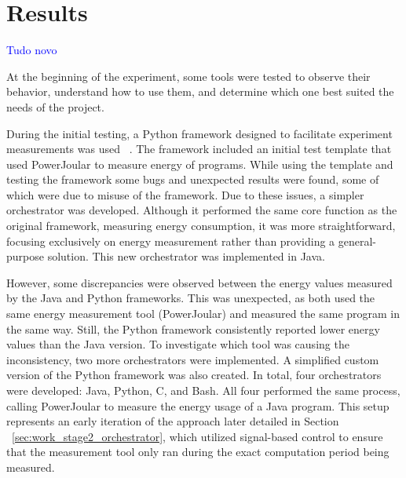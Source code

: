 \chapter{Results}\label{chapter:results}\textcolor{blue}{Tudo novo}


At the beginning of the experiment, some tools were tested to observe their behavior, understand how to use them, and determine which one best suited the needs of the project.

During the initial testing, a Python framework designed to facilitate experiment measurements was used ~\cite{S2_Group_Experiment_Runner}. The framework included an initial test template that used PowerJoular to measure energy of programs. While using the template and testing the framework some bugs and unexpected results were found, some of which were due to misuse of the framework.
Due to these issues, a simpler orchestrator was developed. Although it performed the same core function as the original framework, measuring energy consumption, it was more straightforward, focusing exclusively on energy measurement rather than providing a general-purpose solution. This new orchestrator was implemented in Java.

However, some discrepancies were observed between the energy values measured by the Java and Python frameworks. This was unexpected, as both used the same energy measurement tool (PowerJoular) and measured the same program in the same way. Still, the Python framework consistently reported lower energy values than the Java version.
To investigate which tool was causing the inconsistency, two more orchestrators were implemented. A simplified custom version of the Python framework was also created. In total, four orchestrators were developed: Java, Python, C, and Bash. All four performed the same process, calling PowerJoular to measure the energy usage of a Java program.
This setup represents an early iteration of the approach later detailed in Section ~\ref{sec:work_stage2_orchestrator}, which utilized signal-based control to ensure that the measurement tool only ran during the exact computation period being measured.

